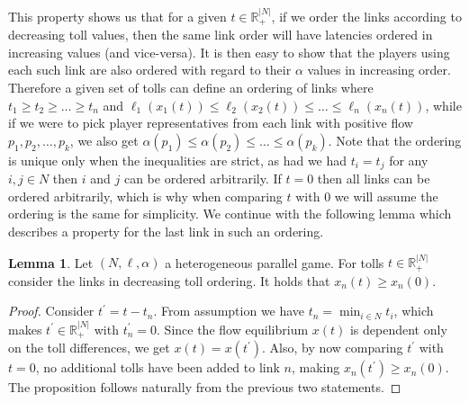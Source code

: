 \documentclass[10pt,a4paper]{book}
\newcommand{\R}{\mathbb{R}}
\theoremstyle{definition}
\newtheorem{lemma}[definition]{Lemma}
\theoremstyle{comment}
\begin{document}
This property shows us that for a given $t \in \R_+^{|N|}$, if we order the links according to decreasing toll values, then the same link order will have latencies ordered in increasing values (and vice-versa).
It is then easy to show that the players using each such link are also ordered with regard to their $\alpha$ values in increasing order.
Therefore a given set of tolls can define an ordering of links where $t_1 \ge t_2 \ge \dots \ge t_n$ and $\ell_1(x_1(t)) \le \ell_2(x_2(t)) \le \dots \le \ell_n(x_n(t))$, while if we were to pick player representatives from each link with positive flow $p_1, p_2, \dots, p_k$, we also get $\alpha(p_1) \le \alpha(p_2) \le \dots \le \alpha(p_k)$.
Note that the ordering is unique only when the inequalities are strict, as had we had $t_i = t_j$ for any $i, j \in N$ then $i$ and $j$ can be ordered arbitrarily.
If $t = 0$ then all links can be ordered arbitrarily, which is why when comparing $t$ with $0$ we will assume the ordering is the same for simplicity.
We continue with the following lemma which describes a property for the last link in such an ordering.

\begin{lemma}
	\label{lemma:xn_xn0_lower_bound}
	Let $(N, \ell, \alpha)$ a heterogeneous parallel game.
	For tolls $t \in \R_+^{|N|}$ consider the links in decreasing toll ordering.
	It holds that $x_n(t) \ge x_n(0)$.
\end{lemma}

\begin{proof}
	Consider $t^\prime = t - t_n$.
	From assumption we have $t_n = \min_{i \in N} t_i$, which makes $t^\prime \in \R_+^{|N|}$ with $t_n^\prime = 0$.
	Since the flow equilibrium $x(t)$ is dependent only on the toll differences, we get $x(t) = x(t^\prime)$.
	Also, by now comparing $t^\prime$ with $t = 0$, no additional tolls have been added to link $n$, making $x_n(t^\prime) \ge x_n(0)$.
	The proposition follows naturally from the previous two statements.
\end{proof}
\end{document}
